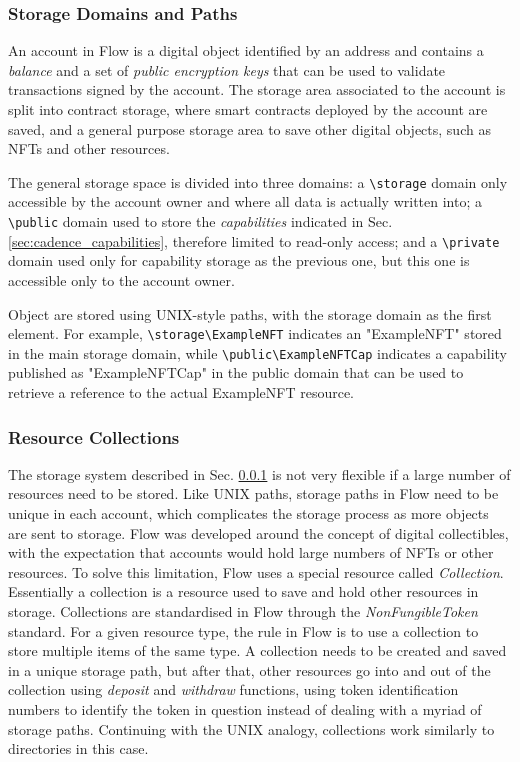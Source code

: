 \documentclass[../NFTComp_IEEE.tex]{subfiles}
\begin{document}
\subsubsection{Storage Domains and Paths}
\label{sec:cadence_storage_domain}
An account in Flow is a digital object identified by an address and contains a \textit{balance} and a set of \textit{public encryption keys} that can be used to validate transactions signed by the account. The storage area associated to the account is split into contract storage, where smart contracts deployed by the account are saved, and a general purpose storage area to save other digital objects, such as NFTs and other resources.
\par
The general storage space is divided into three domains: a \verb |\storage| domain only accessible by the account owner and where all data is actually written into; a \verb |\public| domain used to store the \textit{capabilities} indicated in Sec. \ref{sec:cadence_capabilities}, therefore limited to read-only access; and a \verb |\private| domain used only for capability storage as the previous one, but this one is accessible only to the account owner.
\par
Object are stored using UNIX-style paths, with the storage domain as the first element. For example, \verb |\storage\ExampleNFT| indicates an "ExampleNFT" stored in the main storage domain, while \verb |\public\ExampleNFTCap| indicates a capability published as "ExampleNFTCap" in the public domain that can be used to retrieve a reference to the actual ExampleNFT resource.

\subsubsection{Resource Collections}
\label{sec:resource_collections}
The storage system described in Sec. \ref{sec:cadence_storage_domain} is not very flexible if a large number of resources need to be stored. Like UNIX paths, storage paths in Flow need to be unique in each account, which complicates the storage process as more objects are sent to storage. Flow was developed around the concept of digital collectibles, with the expectation that accounts would hold large numbers of NFTs or other resources. To solve this limitation, Flow uses a special resource called \textit{Collection}. Essentially a collection is a resource used to save and hold other resources in storage. Collections are standardised in Flow through the \textit{NonFungibleToken} standard. For a given resource type, the rule in Flow is to use a collection to store multiple items of the same type. A collection needs to be created and saved in a unique storage path, but after that, other resources go into and out of the collection using \textit{deposit} and \textit{withdraw} functions, using token identification numbers to identify the token in question instead of dealing with a myriad of storage paths. Continuing with the UNIX analogy, collections work similarly to directories in this case.
\end{document}
